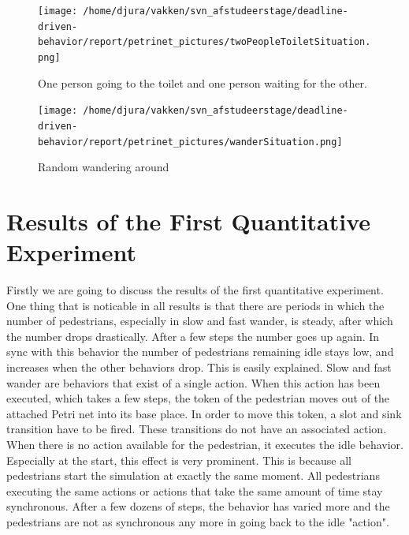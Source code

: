 \documentclass[11pt]{book}
\begin{document}
\begin{figure}
\centering            
\texttt{[image: /home/djura/vakken/svn\_afstudeerstage/deadline-driven-behavior/report/petrinet\_pictures/twoPeopleToiletSituation.png]}
\caption{One person going to the toilet and one person waiting for the other.}
\label{fig:gototoiletpetrinet}
\end{figure}

\begin{figure}
\centering            
\texttt{[image: /home/djura/vakken/svn\_afstudeerstage/deadline-driven-behavior/report/petrinet\_pictures/wanderSituation.png]}
\caption{Random wandering around}
\label{fig:wanderpetrinet}
\end{figure}





\section{Results of the First Quantitative Experiment}
\label{sec:firstquantitative}
Firstly we are going to discuss the results of the first quantitative experiment. One thing that is noticable in all results is that there are periods in which the number of pedestrians, especially in slow and fast wander, is steady, after which the number drops drastically. After a few steps the number goes up again. In sync with this behavior the number of pedestrians remaining idle stays low, and increases when the other behaviors drop. This is easily explained. Slow and fast wander are behaviors that exist of a single action. When this action has been executed, which takes a few steps, the token of the pedestrian moves out of the attached Petri net into its base place. In order to move this token, a slot and sink transition have to be fired. These transitions do not have an associated action. When there is no action available for the pedestrian, it executes the idle behavior. Especially at the start, this effect is very prominent. This is because all pedestrians start the simulation at exactly the same moment. All pedestrians executing the same actions or actions that take the same amount of time stay synchronous. After a few dozens of steps, the behavior has varied more and the pedestrians are not as synchronous any more in going back to the idle "action".
\end{document}
